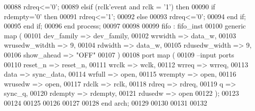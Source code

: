 \begin{DoxyCode}
00088         \textcolor{vhdlchar}{rdreq}\textcolor{vhdlchar}{<=}\textcolor{vhdlchar}{'}\textcolor{vhdllogic}{}\textcolor{vhdllogic}{0}\textcolor{vhdlchar}{'};  
00089         \textcolor{keywordflow}{elsif} \textcolor{vhdlchar}{(}\textcolor{vhdlchar}{rclk}\textcolor{vhdlchar}{'}\textcolor{vhdlkeyword}{event} \textcolor{keywordflow}{and} \textcolor{vhdlchar}{rclk} \textcolor{vhdlchar}{=} \textcolor{vhdlchar}{'}\textcolor{vhdllogic}{}\textcolor{vhdllogic}{1}\textcolor{vhdlchar}{'}\textcolor{vhdlchar}{)} \textcolor{keywordflow}{then}
00090           \textcolor{keywordflow}{if} \textcolor{vhdlchar}{rdempty}\textcolor{vhdlchar}{=}\textcolor{vhdlchar}{'}\textcolor{vhdllogic}{}\textcolor{vhdllogic}{0}\textcolor{vhdlchar}{'} \textcolor{keywordflow}{then} 
00091               \textcolor{vhdlchar}{rdreq}\textcolor{vhdlchar}{<=}\textcolor{vhdlchar}{'}\textcolor{vhdllogic}{}\textcolor{vhdllogic}{1}\textcolor{vhdlchar}{'};
00092           \textcolor{keywordflow}{else} 
00093               \textcolor{vhdlchar}{rdreq}\textcolor{vhdlchar}{<=}\textcolor{vhdlchar}{'}\textcolor{vhdllogic}{}\textcolor{vhdllogic}{0}\textcolor{vhdlchar}{'};
00094           \textcolor{keywordflow}{end} \textcolor{keywordflow}{if};
00095         \textcolor{keywordflow}{end} \textcolor{keywordflow}{if};
00096     \textcolor{keywordflow}{end} \textcolor{keywordflow}{process};
00097 
00098 
00099 fifo :  fifo_inst 
00100   \textcolor{keywordflow}{generic} \textcolor{keywordflow}{map} (
00101             dev_family      => dev_family, 
00102             wrwidth         => data_w, 
00103             wrusedw_witdth  => \textcolor{vhdllogic}{9}, 
00104             rdwidth         => data_w, 
00105             rdusedw_width   => \textcolor{vhdllogic}{9},
00106             show_ahead      => \textcolor{keyword}{"OFF"}
00107   \textcolor{vhdlchar}{)}  
00108   \textcolor{keywordflow}{port} \textcolor{keywordflow}{map} (
00109 \textcolor{keyword}{      --input ports }
00110       reset_n       => reset_n, 
00111       wrclk         => wclk,
00112       wrreq         => wrreq,
00113       data          => sync_data, 
00114       wrfull        => \textcolor{keywordflow}{open},
00115         wrempty       => \textcolor{keywordflow}{open}, 
00116       wrusedw       => \textcolor{keywordflow}{open},
00117       rdclk          => rclk,
00118       rdreq         => rdreq,
00119       q             => sync_q,
00120       rdempty       => rdempty,
00121       rdusedw       => \textcolor{keywordflow}{open}     
00122         \textcolor{vhdlchar}{)};
00123 
00124 
00125     
00126     
00127   
00128 \textcolor{keywordflow}{end} \textcolor{vhdlchar}{arch};   
00129 
00130 
00131 
00132 
\end{DoxyCode}
